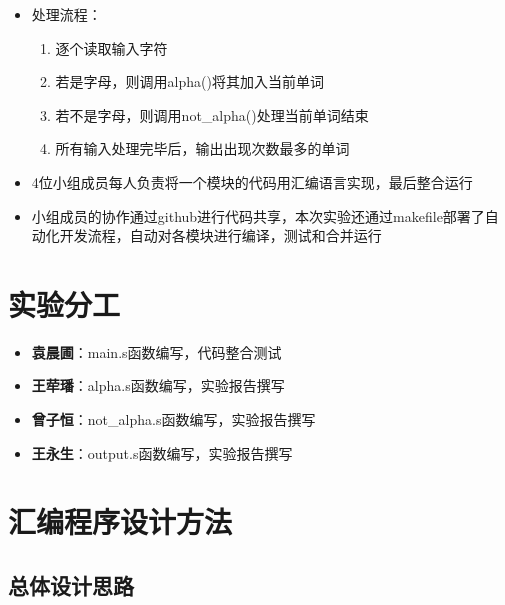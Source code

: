 \documentclass[10pt,a4paper]{article}
\begin{document}
\begin{itemize}
\begin{itemize}
        \item 处理流程：
        \begin{enumerate}
            \item 逐个读取输入字符
            \item 若是字母，则调用alpha()将其加入当前单词
            \item 若不是字母，则调用not\_alpha()处理当前单词结束
            \item 所有输入处理完毕后，输出出现次数最多的单词
        \end{enumerate}
        
        \item 4位小组成员每人负责将一个模块的代码用汇编语言实现，最后整合运行
        \item 小组成员的协作通过github进行代码共享，本次实验还通过makefile部署了自动化开发流程，自动对各模块进行编译，测试和合并运行
    \end{itemize}
\end{itemize}

\section{实验分工}

\begin{itemize}
    \item \textbf{袁晨圃}：main.s函数编写，代码整合测试
    \item \textbf{王荦璠}：alpha.s函数编写，实验报告撰写
    \item \textbf{曾子恒}：not\_alpha.s函数编写，实验报告撰写
    \item \textbf{王永生}：output.s函数编写，实验报告撰写
\end{itemize}

\section{汇编程序设计方法}

\subsection{总体设计思路}
\end{document}
